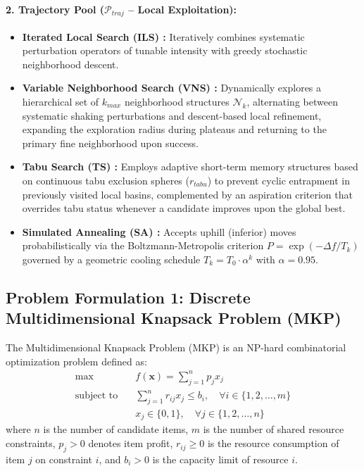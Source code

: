 \documentclass[review]{elsarticle}
\begin{document}
\paragraph{2. Trajectory Pool ($\mathcal{P}_{traj}$ -- Local Exploitation):}
\begin{itemize}
    \item \textbf{Iterated Local Search (ILS) \cite{lourenco2003iterated}:} Iteratively combines systematic perturbation operators of tunable intensity with greedy stochastic neighborhood descent.
    \item \textbf{Variable Neighborhood Search (VNS) \cite{mladenovic1997variable}:} Dynamically explores a hierarchical set of $k_{max}$ neighborhood structures $\mathcal{N}_k$, alternating between systematic shaking perturbations and descent-based local refinement, expanding the exploration radius during plateaus and returning to the primary fine neighborhood upon success.
    \item \textbf{Tabu Search (TS) \cite{du2016tabu}:} Employs adaptive short-term memory structures based on continuous tabu exclusion spheres ($r_{tabu}$) to prevent cyclic entrapment in previously visited local basins, complemented by an aspiration criterion that overrides tabu status whenever a candidate improves upon the global best.
    \item \textbf{Simulated Annealing (SA) \cite{kirkpatrick1983optimization}:} Accepts uphill (inferior) moves probabilistically via the Boltzmann-Metropolis criterion $P = \exp(-\Delta f / T_k)$ governed by a geometric cooling schedule $T_k = T_0 \cdot \alpha^k$ with $\alpha = 0.95$.
\end{itemize}

\subsection{Problem Formulation 1: Discrete Multidimensional Knapsack Problem (MKP)}
\label{sec:mkp_formulation}

The Multidimensional Knapsack Problem (MKP) is an NP-hard combinatorial optimization problem defined as:
\begin{align}
\max \quad & f(\mathbf{x}) = \sum_{j=1}^{n} p_j x_j \label{eq:mkp_obj} \\
\text{subject to} \quad & \sum_{j=1}^{n} r_{ij} x_j \le b_i, \quad \forall i \in \{1, 2, \dots, m\} \label{eq:mkp_cons} \\
& x_j \in \{0, 1\}, \quad \forall j \in \{1, 2, \dots, n\} \label{eq:mkp_vars}
\end{align}
where $n$ is the number of candidate items, $m$ is the number of shared resource constraints, $p_j > 0$ denotes item profit, $r_{ij} \ge 0$ is the resource consumption of item $j$ on constraint $i$, and $b_i > 0$ is the capacity limit of resource $i$.
\end{document}
